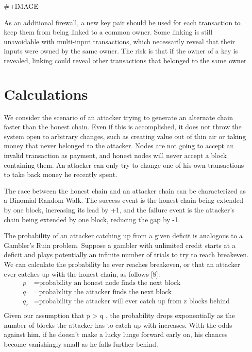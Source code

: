\documentclass[11pt]{article}
\begin{document}
\#+IMAGE

As an additional firewall, a new key pair should be used for each transaction to keep them from being linked to a common owner.
Some linking is still unavoidable with multi-input transactions, which necessarily reveal that their inputs were owned by the same owner.
The risk is that if the owner of a key is revealed, linking could reveal other transactions that belonged to the same owner

\section{Calculations}
\label{sec:org3834c52}
We consider the scenario of an attacker trying to generate an alternate chain faster than the honest chain.
Even if this is accomplished, it does not throw the system open to arbitrary changes, such as creating value out of thin air or taking money that never belonged to the attacker.
Nodes are not going to accept an invalid transaction as payment, and honest nodes will never accept a block containing them.
An attacker can only try to change one of his own transactions to take back money he recently spent.

The race between the honest chain and an attacker chain can be characterized as a Binomial Random Walk.
The success event is the honest chain being extended by one block, increasing its lead by +1, and the failure event is the attacker's chain being extended by one block, reducing the gap by -1.

The probability of an attacker catching up from a given deficit is analogous to a Gambler's Ruin problem.
Suppose a gambler with unlimited credit starts at a deficit and plays potentially an infinite number of trials to try to reach breakeven.
We can calculate the probability he ever reaches breakeven, or that an attacker ever catches up with the honest chain, as follows [8]:
\begin{align*}
p &= \text{probability an honest node finds the next block} \\
q &= \text{probability the attacker finds the next block} \\
q_z &= \text{probability the attacker will ever catch up from z blocks behind} \\
\end{align*}
Given our assumption that p > q , the probability drops exponentially as the number of blocks the attacker has to catch up with increases.
With the odds against him, if he doesn't make a lucky lunge forward early on, his chances become vanishingly small as he falls further behind.
\end{document}
